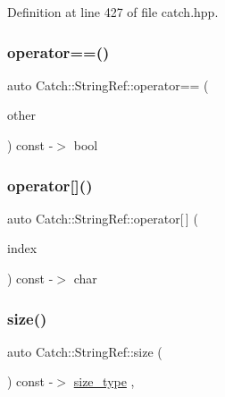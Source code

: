 Definition at line 427 of file catch.\+hpp.

\mbox{\label{class_catch_1_1_string_ref_aabb30149ab961187e4b3ff3394bf6e73}} 
\subsubsection{\texorpdfstring{operator==()}{operator==()}}
{\footnotesize\ttfamily auto Catch\+::\+String\+Ref\+::operator== (\begin{DoxyParamCaption}\item[{\mbox{\hyperlink{class_catch_1_1_string_ref}{String\+Ref}} const \&}]{other }\end{DoxyParamCaption}) const -\/$>$  bool\hspace{0.3cm}{\ttfamily [noexcept]}}

\mbox{\label{class_catch_1_1_string_ref_a4ba2e01eec1f0f56c257d213c796ab3b}} 
\subsubsection{\texorpdfstring{operator[]()}{operator[]()}}
{\footnotesize\ttfamily auto Catch\+::\+String\+Ref\+::operator\mbox{[}$\,$\mbox{]} (\begin{DoxyParamCaption}\item[{\mbox{\hyperlink{class_catch_1_1_string_ref_a06b4db8fc82b197004291cf370b2ba7c}{size\+\_\+type}}}]{index }\end{DoxyParamCaption}) const -\/$>$  char\hspace{0.3cm}{\ttfamily [noexcept]}}

\mbox{\label{class_catch_1_1_string_ref_ae084d72cb2952cee61a63ef36611d0ad}} 
\subsubsection{\texorpdfstring{size()}{size()}}
{\footnotesize\ttfamily auto Catch\+::\+String\+Ref\+::size (\begin{DoxyParamCaption}{ }\end{DoxyParamCaption}) const -\/$>$ \mbox{\hyperlink{class_catch_1_1_string_ref_a06b4db8fc82b197004291cf370b2ba7c}{size\+\_\+type}} \hspace{0.3cm}{\ttfamily [inline]}, {\ttfamily [noexcept]}}



